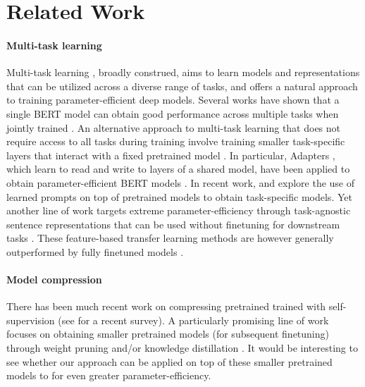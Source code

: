 \section{Related Work}

\paragraph{Multi-task learning} Multi-task learning \citep{caruana1997mtl}, broadly construed, aims to learn models and representations that can be utilized across a diverse range of tasks, and offers a natural approach to training parameter-efficient deep models.  Several works have shown that a single BERT model can obtain good performance  across multiple tasks when jointly trained \citep{liu2019multi,clark2019bam,stickland2019pal}. An alternative approach to multi-task learning that does not require access to all tasks during training involve training smaller task-specific layers that interact with a fixed pretrained model \citep{rebuffi2018adap,Zhang2019sidetuning}. In particular, Adapters \citep{rebuffi2018adap}, which learn to read and write to layers of a shared model, have been applied to obtain parameter-efficient BERT models \citep{houlsby2019adapters,pfeiffer2020fusion,pfeiffer2020adapterhub,pfeiffer2020madx}. In recent work, \citet{li2021prefix} and \citet{qin2021learning} explore the use of learned prompts on top of pretrained models to obtain task-specific models. Yet another line of work targets extreme parameter-efficiency through task-agnostic sentence representations that can be used without finetuning for downstream tasks \citep{le2014paragraph,kiros2015skipthought,wieting2016sentemb,hill-etal-2016-learning,arora2017simple,conneau2017infersent,cer-etal-2018-universal,zhang-etal-2018-learning-universal,subra2018sent,reimers2019sbert,zhang2020sentence}. These feature-based transfer learning methods are however generally outperformed by fully finetuned models \citep{howard2018universal}.

\paragraph{Model compression} There has been much recent work on compressing  pretrained trained with self-supervision (see \cite{ganesh2019compsurvey} for a recent survey). A particularly promising line of work focuses on obtaining smaller pretrained models (for subsequent finetuning) through weight pruning \citep{gordon2020compress,sajjad2020poor,chen2020bertlottery} and/or knowledge distillation \citep{sanh2019distil,sun2019patient,turc2019read,jiao2019tiny,sun-etal-2020-mobilebert}. It would be interesting to see whether our approach can be applied on top of these smaller pretrained models to for even greater parameter-efficiency.


